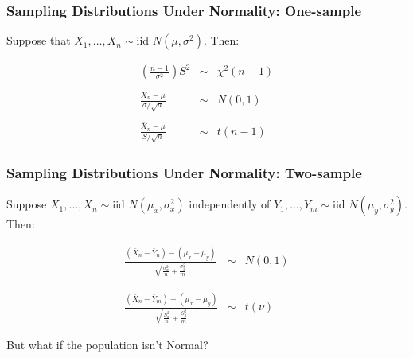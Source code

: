 \documentclass[handout]{beamer}
\begin{document}
\begin{frame}
\frametitle{Sampling Distributions Under Normality: One-sample}
Suppose that $X_1, \hdots, X_n \sim \mbox{iid } N(\mu,\sigma^2)$. Then:

	\begin{eqnarray*}
		\left(\frac{n-1}{\sigma^2}\right) S^2&\sim&\chi^2(n-1)\\ \\
		\frac{\bar{X}_n-\mu}{\sigma/\sqrt{n}}&\sim& N(0,1)\\ \\
		\frac{\bar{X}_n-\mu}{S/\sqrt{n}}&\sim&t(n-1)
	\end{eqnarray*}
\end{frame}
\begin{frame}
\frametitle{Sampling Distributions Under Normality: Two-sample}
Suppose $X_1, \hdots, X_{n} \sim \mbox{iid } N(\mu_x, \sigma^2_x)$ independently of $Y_1, \hdots, Y_{m} \sim \mbox{iid } N(\mu_y, \sigma^2_y)$. Then:


	\begin{eqnarray*}
\frac{(\bar{X}_n - \bar{Y}_n) - (\mu_x -\mu_y)}{\sqrt{\displaystyle\frac{\sigma_x^2}{n} + \frac{\sigma_y^2}{m} }} &\sim& N(0,1) \\ \\ \\
		\frac{\left(\bar{X}_n - \bar{Y}_m\right) - (\mu_x - \mu_y)}{\sqrt{\displaystyle\frac{S_x^2}{n} + \frac{S_y^2}{m} }}&\sim& t(\nu)
	\end{eqnarray*}
\end{frame}

\begin{frame}
\begin{center}\Huge But what if the population isn't Normal?\end{center}
\end{frame}
\end{document}
